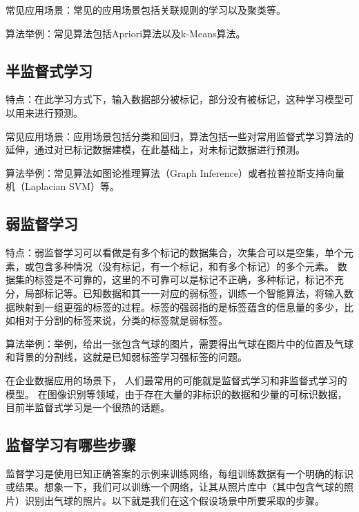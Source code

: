 常见应用场景：常见的应用场景包括关联规则的学习以及聚类等。

算法举例：常见算法包括Apriori算法以及k-Means算法。

\subsection{半监督式学习}

特点：在此学习方式下，输入数据部分被标记，部分没有被标记，这种学习模型可以用来进行预测。

常见应用场景：应用场景包括分类和回归，算法包括一些对常用监督式学习算法的延伸，通过对已标记数据建模，在此基础上，对未标记数据进行预测。

算法举例：常见算法如图论推理算法（Graph Inference）或者拉普拉斯支持向量机（Laplacian SVM）等。

\subsection{弱监督学习}

特点：弱监督学习可以看做是有多个标记的数据集合，次集合可以是空集，单个元素，或包含多种情况（没有标记，有一个标记，和有多个标记）的多个元素。 数据集的标签是不可靠的，这里的不可靠可以是标记不正确，多种标记，标记不充分，局部标记等。已知数据和其一一对应的弱标签，训练一个智能算法，将输入数据映射到一组更强的标签的过程。标签的强弱指的是标签蕴含的信息量的多少，比如相对于分割的标签来说，分类的标签就是弱标签。

算法举例：举例，给出一张包含气球的图片，需要得出气球在图片中的位置及气球和背景的分割线，这就是已知弱标签学习强标签的问题。

在企业数据应用的场景下， 人们最常用的可能就是监督式学习和非监督式学习的模型。 在图像识别等领域，由于存在大量的非标识的数据和少量的可标识数据， 目前半监督式学习是一个很热的话题。

\subsection{监督学习有哪些步骤}
监督学习是使用已知正确答案的示例来训练网络，每组训练数据有一个明确的标识或结果。想象一下，我们可以训练一个网络，让其从照片库中（其中包含气球的照片）识别出气球的照片。以下就是我们在这个假设场景中所要采取的步骤。

